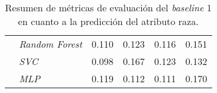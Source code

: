 \begin{table}[htpb]
{\begin{tabular}{llcccc}
                                            & \emph{Random Forest}        & 0.110 & 0.123 & 0.116 & 0.151\\
        \cmidrule{2-6}
                                            & \emph{SVC}                  & 0.098 & 0.167 & 0.123 & 0.132\\
        \cmidrule{2-6}
                                            & \emph{MLP}                  & 0.119 & 0.112 & 0.111 & 0.170\\
        \bottomrule
        \end{tabular}}
    \caption{Resumen de m\'etricas de evaluaci\'on del \emph{baseline} 1 en cuanto a la predicci\'on del atributo raza.}
    \label{table:eval_baseline1_race}
\end{table}

\begin{table}[htpb]
    \centering
    \caption{Resumen de m\'etricas de evaluaci\'on del \emph{baseline} 2 en cuanto a la predicci\'on del atributo g\'enero.}
    \label{table:eval_baseline2_gender}
\end{table}

\begin{table}[htpb]
    \centering
    \caption{Resumen de m\'etricas de evaluaci\'on del \emph{baseline} 2 en cuanto a la predicci\'on del atributo raza.}
    \label{table:eval_baseline2_race}
\end{table}


